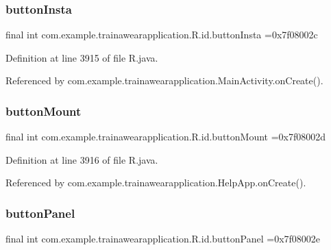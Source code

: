 \subsubsection{\texorpdfstring{buttonInsta}{buttonInsta}}
{\footnotesize\ttfamily final int com.\+example.\+trainawearapplication.\+R.\+id.\+button\+Insta =0x7f08002c\hspace{0.3cm}{\ttfamily [static]}}



Definition at line 3915 of file R.\+java.



Referenced by com.\+example.\+trainawearapplication.\+Main\+Activity.\+on\+Create().

\mbox{\label{classcom_1_1example_1_1trainawearapplication_1_1_r_1_1id_a6c4fdd6156c22bda2b7d1a23a3d34060}} 
\subsubsection{\texorpdfstring{buttonMount}{buttonMount}}
{\footnotesize\ttfamily final int com.\+example.\+trainawearapplication.\+R.\+id.\+button\+Mount =0x7f08002d\hspace{0.3cm}{\ttfamily [static]}}



Definition at line 3916 of file R.\+java.



Referenced by com.\+example.\+trainawearapplication.\+Help\+App.\+on\+Create().

\mbox{\label{classcom_1_1example_1_1trainawearapplication_1_1_r_1_1id_a5f007760c048e8be4b3d70247b0b0433}} 
\subsubsection{\texorpdfstring{buttonPanel}{buttonPanel}}
{\footnotesize\ttfamily final int com.\+example.\+trainawearapplication.\+R.\+id.\+button\+Panel =0x7f08002e\hspace{0.3cm}{\ttfamily [static]}}



